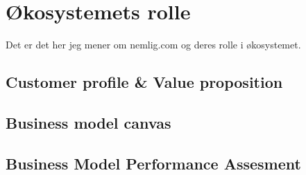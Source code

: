 \section{Økosystemets rolle}

Det er det her jeg mener om nemlig.com og deres rolle i økosystemet.

\subsection{Customer profile \& Value proposition}
\subsection{Business model canvas}
\subsection{Business Model Performance Assesment}